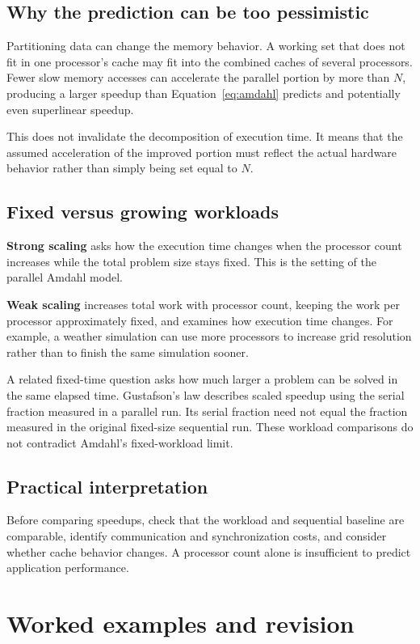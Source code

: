 \documentclass[11pt,a4paper]{article}
\begin{document}
\subsection{Why the prediction can be too pessimistic}
Partitioning data can change the memory behavior. A working set that does
not fit in one processor's cache may fit into the combined caches of several
processors. Fewer slow memory accesses can accelerate the parallel portion
by more than $N$, producing a larger speedup than Equation~\eqref{eq:amdahl}
predicts and potentially even superlinear speedup.

This does not invalidate the decomposition of execution time. It means that
the assumed acceleration of the improved portion must reflect the actual
hardware behavior rather than simply being set equal to $N$.

\subsection{Fixed versus growing workloads}
\textbf{Strong scaling} asks how the execution time changes when the processor
count increases while the total problem size stays fixed. This is the setting
of the parallel Amdahl model.

\textbf{Weak scaling} increases total work with processor count, keeping the
work per processor approximately fixed, and examines how execution time changes.
For example, a weather simulation can use more processors to increase grid
resolution rather than to finish the same simulation sooner.

A related fixed-time question asks how much larger a problem can be solved
in the same elapsed time. Gustafson's law describes scaled speedup using
the serial fraction measured in a parallel run. Its serial fraction need
not equal the fraction measured in the original fixed-size sequential run.
These workload comparisons do not contradict Amdahl's fixed-workload limit.

\subsection{Practical interpretation}
Before comparing speedups, check that the workload and sequential baseline
are comparable, identify communication and synchronization costs, and consider
whether cache behavior changes. A processor count alone is insufficient to
predict application performance.

\newpage
\section{Worked examples and revision}
\end{document}
